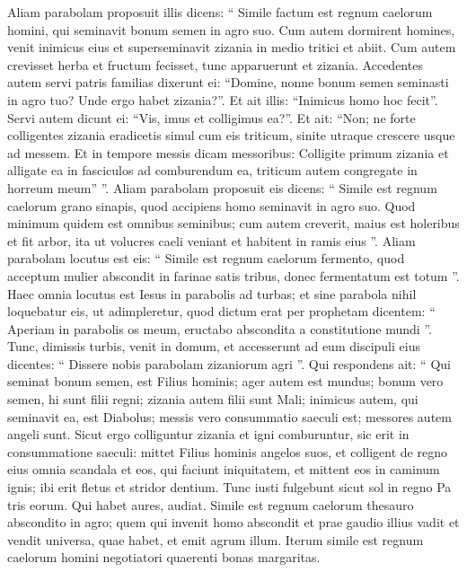 \begin{biblechapter}
\begin{biblechapter}
\begin{biblechapter}
\begin{biblechapter}
\begin{biblechapter}
\begin{biblechapter}
\begin{biblechapter}
\begin{biblechapter}
\begin{biblechapter}
\begin{biblechapter}
\begin{biblechapter}
\begin{biblechapter}
\begin{biblechapter}
 \verse Aliam parabolam proposuit illis dicens: “ Simile factum est regnum caelorum homini, qui seminavit bonum semen in agro suo. 
\verse Cum autem dormirent homines, venit inimicus eius et superseminavit zizania in medio tritici et abiit. 
\verse Cum autem crevisset herba et fructum fecisset, tunc apparuerunt et zizania. 
\verse Accedentes autem servi patris familias dixerunt ei: “Domine, nonne bonum semen seminasti in agro tuo? Unde ergo habet zizania?”. 
\verse Et ait illis: “Inimicus homo hoc fecit”. Servi autem dicunt ei: “Vis, imus et colligimus ea?”. 
\verse Et ait: “Non; ne forte colligentes zizania eradicetis simul cum eis triticum, 
\verse sinite utraque crescere usque ad messem. Et in tempore messis dicam messoribus: Colligite primum zizania et alligate ea in fasciculos ad comburendum ea, triticum autem congregate in horreum meum” ”.
 \verse Aliam parabolam proposuit eis dicens: “ Simile est regnum caelorum grano sinapis, quod accipiens homo seminavit in agro suo. 
\verse Quod minimum quidem est omnibus seminibus; cum autem creverit, maius est holeribus et fit arbor, ita ut volucres caeli veniant et habitent in ramis eius ”.
 \verse Aliam parabolam locutus est eis: “ Simile est regnum caelorum fermento, quod acceptum mulier abscondit in farinae satis tribus, donec fermentatum est totum ”.
 \verse Haec omnia locutus est Iesus in parabolis ad turbas; et sine parabola nihil loquebatur eis, 
\verse ut adimpleretur, quod dictum erat per prophetam dicentem:
 “ Aperiam in parabolis os meum,
 eructabo abscondita a constitutione mundi ”.
 \verse Tunc, dimissis turbis, venit in domum, et accesserunt ad eum discipuli eius dicentes: “ Dissere nobis parabolam zizaniorum agri ”. 
\verse Qui respondens ait: “ Qui seminat bonum semen, est Filius hominis; 
\verse ager autem est mundus; bonum vero semen, hi sunt filii regni; zizania autem filii sunt Mali; 
 \verse inimicus autem, qui seminavit ea, est Diabolus; messis vero consummatio saeculi est; messores autem angeli sunt. 
\verse Sicut ergo colliguntur zizania et igni comburuntur, sic erit in consummatione saeculi: 
\verse mittet Filius hominis angelos suos, et colligent de regno eius omnia scandala et eos, qui faciunt iniquitatem, 
\verse et mittent eos in caminum ignis; ibi erit fletus et stridor dentium. 
 \verse Tunc iusti fulgebunt sicut sol in regno Pa tris eorum. Qui habet aures, audiat. 
\verse Simile est regnum caelorum thesauro abscondito in agro; quem qui invenit homo abscondit et prae gaudio illius vadit et vendit universa, quae habet, et emit agrum illum.
 \verse Iterum simile est regnum caelorum homini negotiatori quaerenti bonas margaritas. 

\end{biblechapter}
\end{biblechapter}
\end{biblechapter}
\end{biblechapter}
\end{biblechapter}
\end{biblechapter}
\end{biblechapter}
\end{biblechapter}
\end{biblechapter}
\end{biblechapter}
\end{biblechapter}
\end{biblechapter}
\end{biblechapter}
